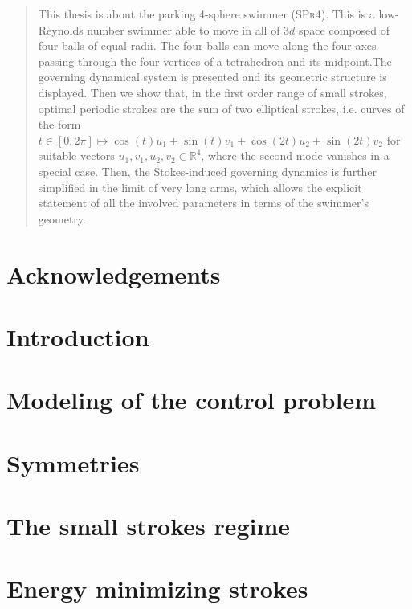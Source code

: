 \documentclass[10pt,a4paper, twoside]{article}
\numberwithin{equation}{section}
\theoremstyle{plain}
\theoremstyle{plain}
\theoremstyle{plain}
\theoremstyle{remark}
\theoremstyle{definition}
\theoremstyle{definition}
\theoremstyle{plain}
\theoremstyle{plain}
\newcommand{\R}{\mathbb{R}}
\newcommand{\spr}{\textsc{SPr4}}
\begin{document}
    \begin{abstract}
    This thesis is about the parking 4-sphere swimmer (\spr). This is a low-Reynolds number swimmer able to move in all of $3d$ space composed of four balls of equal radii. The four balls can move along the four axes passing through the four vertices of a tetrahedron and its midpoint.The governing dynamical system is presented and its geometric structure is displayed. Then we show that, in the first order range of small strokes, optimal periodic strokes are the sum of two elliptical strokes, i.e. curves of the form $t \in [0, 2 \pi] \mapsto \cos(t) u_1 + \sin(t) v_1 + \cos(2t) u_2 + \sin(2 t) v_2$ for suitable vectors $u_1, v_1, u_2, v_2 \in \R^4$, where the second mode vanishes in a special case. Then, the Stokes-induced governing dynamics is further simplified in the limit of very long arms, which allows the explicit statement of all the involved parameters in terms of the swimmer's geometry. 
    \end{abstract}

\newpage
\section*{Acknowledgements}


\newpage
\setcounter{tocdepth}{2}
\tableofcontents

\newpage

\section{Introduction}


\section[Modeling]{Modeling of the control problem}


\section{Symmetries}


\section{The small strokes regime}


\section{Energy minimizing strokes}

\end{document}
